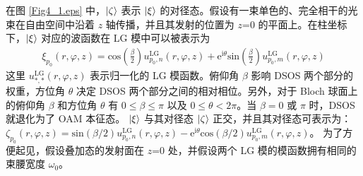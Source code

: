 \documentclass[master]{thesis-uestc}
\begin{document}
\noindent 在图 \ref{Fig4_1.eps} 中，$\ket{\zeta}$ 表示 $\ket{\xi}$ 的对径态。假设有一束单色的、完全相干的光束在自由空间中沿着 $z$ 轴传播，并且其发射的位置为 $z$=0 的平面上。在柱坐标下，$\ket{\xi}$ 对应的波函数在 LG 模中可以被表示为
\begin{equation}
\begin{split}
\xi_{p_0}(r,\varphi,z)=\mathrm{cos}\left(\frac{\beta}{2}\right)u_{p_0,n}^\mathrm{LG}(r,\varphi,z)+\mathrm{e}^{\mathrm{i}\theta}\mathrm{sin}\left(\frac{\beta}{2}\right)u_{p_0,m}^\mathrm{LG}(r,\varphi,z)
\label{Eq1}
\end{split}
\end{equation}
\noindent 这里 $u_{\ast,\ast}^\mathrm{LG}(r,\varphi,z)$ 表示归一化的 LG 模函数。俯仰角 $\beta$ 影响 DSOS 两个部分的权重，方位角 $\theta$ 决定 DSOS 两个部分之间的相对相位。另外，对于 Bloch 球面上的俯仰角 $\beta$ 和方位角 $\theta$ 有 $0 \leq \beta \leq \pi$ 以及 $0 \leq \theta < 2\pi$。当 $\beta=0$ 或 $\pi$ 时，DSOS 就退化为了 OAM 本征态。 $\ket{\xi}$ 与其对径态 $\ket{\zeta}$ 正交，并且其对径态可表示为：$\zeta_{p_0}(r,\varphi,z)=\mathrm{sin}(\beta/2)u_{p_0,n}^\mathrm{LG}(r,\varphi,z)-\mathrm{e}^{\mathrm{i}\theta}\mathrm{cos}(\beta/2)u_{p_0,m}^\mathrm{LG}(r,\varphi,z)$。
为了方便起见，假设叠加态的发射面在 $z$=0 处，并假设两个 LG 模的模函数拥有相同的束腰宽度 $\omega_0$。
\end{document}
